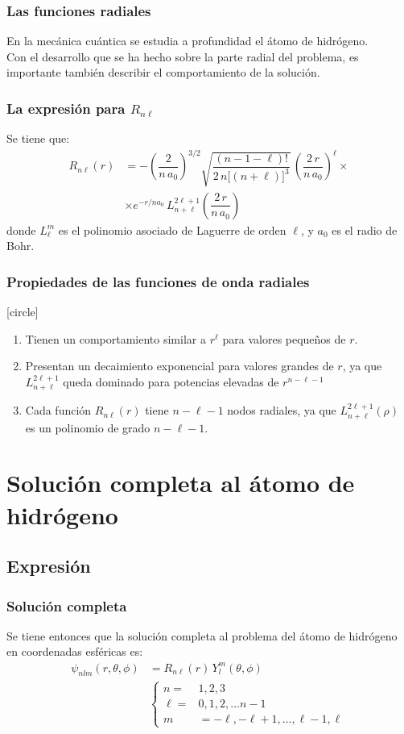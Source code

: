 \documentclass[12pt]{beamer}
\begin{document}
\begin{frame}
\frametitle{Las funciones radiales}
En la mecánica cuántica se estudia a profundidad el átomo de hidrógeno.
\\
\bigskip
\pause
Con el desarrollo que se ha hecho sobre la parte radial del problema, es importante también describir el comportamiento de la solución.
\end{frame}
\begin{frame}
\frametitle{La expresión para $R_{n \ell}$}
Se tiene que:
\pause
\begin{align*}
R_{n \ell} (r) &= - \left( \dfrac{2}{n \, a_{0}} \right)^{3/2} \sqrt{\dfrac{(n - 1 -\ell)!}{2 \, n \big[(n + \ell) \big]^{3}}} \, \left( \dfrac{2 \, r}{n \, a_{0}} \right)^{\ell} \times \\[0.5em]
&\times e^{-r/n a_{0}} \, L_{n+\ell}^{2 \ell+1} \left( \dfrac{2 \, r}{n \, a_{0}} \right)
\end{align*}
donde $L_{\ell}^{m}$ es el polinomio asociado de Laguerre de orden $\ell$, y $a_{0}$ es el radio de Bohr.
\end{frame}
\begin{frame}
\frametitle{Propiedades de las funciones de onda radiales}
[circle]
\begin{enumerate}[<+->]
\item Tienen un comportamiento similar a $r^{\ell}$ para valores pequeños de $r$.
\item Presentan un decaimiento exponencial para valores grandes de $r$, ya que $L_{n+\ell}^{2 \ell+1}$ queda dominado para potencias elevadas de $r^{n-\ell-1}$
\item Cada función $R_{n \ell}(r)$ tiene $n-\ell-1$ nodos radiales, ya que $L_{n+\ell}^{2 \ell+1}(\rho)$ es un polinomio de grado $n - \ell - 1$.
\end{enumerate}
\end{frame}

\section{Solución completa al átomo de hidrógeno}
\subsection{Expresión}

\begin{frame}
\frametitle{Solución completa}
Se tiene entonces que la solución completa al problema del átomo de hidrógeno en coordenadas esféricas es:
\pause
\begin{align*}
\psi_{n l m} (r, \theta, \phi) &= R_{n \ell}(r) \, Y_{l}^{m} (\theta, \phi) \\[0.5em]
&\begin{cases}
n = & 1, 2, 3 \\
\ell = & 0, 1, 2, \ldots n-1 \\
m &= -\ell, -\ell + 1, \ldots, \ell -1, \ell
\end{cases}
\end{align*}
\end{frame}
\end{document}
